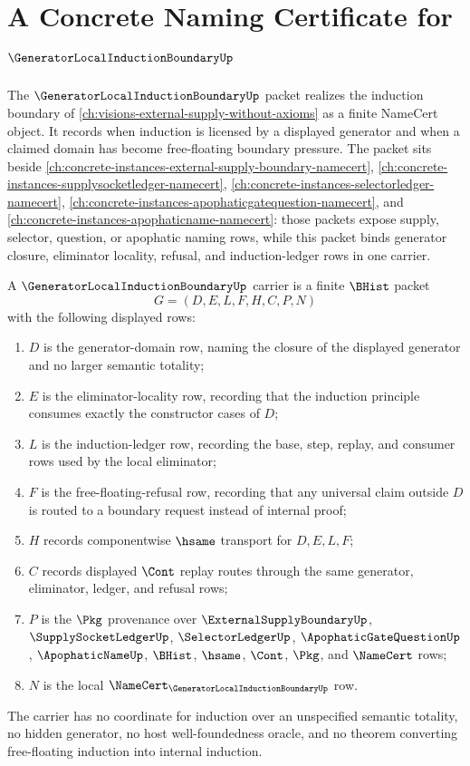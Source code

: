 \chapter{A Concrete Naming Certificate for $\GeneratorLocalInductionBoundaryUp$}
\label{ch:concrete-instances-generator-local-induction-boundary-namecert}

The $\GeneratorLocalInductionBoundaryUp$ packet realizes the induction boundary of \autoref{ch:visions-external-supply-without-axioms} as a finite NameCert object. It records when induction is licensed by a displayed generator and when a claimed domain has become free-floating boundary pressure. The packet sits beside \autoref{ch:concrete-instances-external-supply-boundary-namecert}, \autoref{ch:concrete-instances-supplysocketledger-namecert}, \autoref{ch:concrete-instances-selectorledger-namecert}, \autoref{ch:concrete-instances-apophaticgatequestion-namecert}, and \autoref{ch:concrete-instances-apophaticname-namecert}: those packets expose supply, selector, question, or apophatic naming rows, while this packet binds generator closure, eliminator locality, refusal, and induction-ledger rows in one carrier.

\begin{definition}
\label{def:generator-local-induction-boundary-carrier}
A $\GeneratorLocalInductionBoundaryUp$ carrier is a finite $\BHist$ packet
$$
G=(D,E,L,F,H,C,P,N)
$$
with the following displayed rows:
\begin{enumerate}
\item $D$ is the generator-domain row, naming the closure of the displayed generator and no larger semantic totality;
\item $E$ is the eliminator-locality row, recording that the induction principle consumes exactly the constructor cases of $D$;
\item $L$ is the induction-ledger row, recording the base, step, replay, and consumer rows used by the local eliminator;
\item $F$ is the free-floating-refusal row, recording that any universal claim outside $D$ is routed to a boundary request instead of internal proof;
\item $H$ records componentwise $\hsame$ transport for $D,E,L,F$;
\item $C$ records displayed $\Cont$ replay routes through the same generator, eliminator, ledger, and refusal rows;
\item $P$ is the $\Pkg$ provenance over $\ExternalSupplyBoundaryUp$, $\SupplySocketLedgerUp$, $\SelectorLedgerUp$, $\ApophaticGateQuestionUp$, $\ApophaticNameUp$, $\BHist$, $\hsame$, $\Cont$, $\Pkg$, and $\NameCert$ rows;
\item $N$ is the local $\NameCert_{\GeneratorLocalInductionBoundaryUp}$ row.
\end{enumerate}
The carrier has no coordinate for induction over an unspecified semantic totality, no hidden generator, no host well-foundedness oracle, and no theorem converting free-floating induction into internal induction.
\end{definition}

